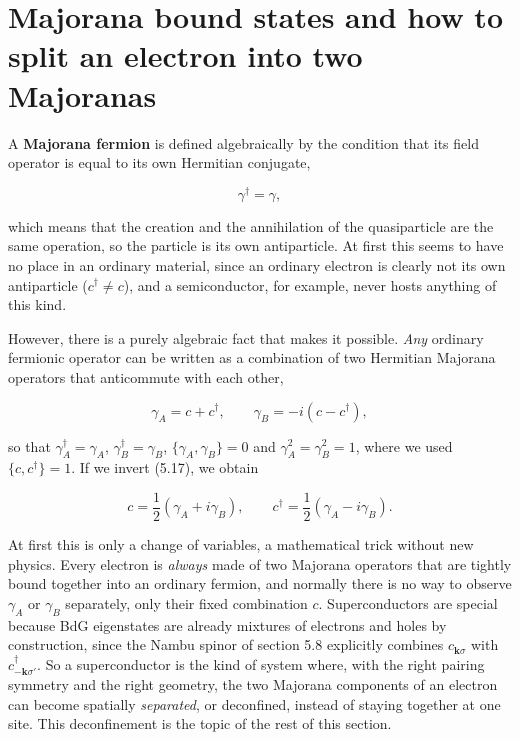 \section{Majorana bound states and how to split an electron into two Majoranas}

A \textbf{Majorana fermion} is defined algebraically by the condition that its field operator is
equal to its own Hermitian conjugate,

\begin{equation}
\gamma^\dagger = \gamma,
\end{equation}

which means that the creation and the annihilation of the quasiparticle are the same operation, so
the particle is its own antiparticle. At first this seems to have no place in an ordinary material,
since an ordinary electron is clearly not its own antiparticle ($c^\dagger \ne c$), and a
semiconductor, for example, never hosts anything of this kind.

However, there is a purely algebraic fact that makes it possible. \emph{Any} ordinary fermionic
operator can be written as a combination of two Hermitian Majorana operators that anticommute with
each other,

\begin{equation}
\gamma_A = c + c^\dagger, \qquad \gamma_B = -i\left(c - c^\dagger\right),
\end{equation}

so that $\gamma_A^\dagger = \gamma_A$, $\gamma_B^\dagger = \gamma_B$, $\{\gamma_A,\gamma_B\}=0$ and
$\gamma_A^2=\gamma_B^2=1$, where we used $\{c,c^\dagger\}=1$. If we invert (5.17), we obtain

\begin{equation}
c = \frac{1}{2}\left(\gamma_A + i\gamma_B\right), \qquad c^\dagger = \frac{1}{2}\left(\gamma_A - i\gamma_B\right).
\end{equation}

At first this is only a change of variables, a mathematical trick without new physics. Every
electron is \emph{always} made of two Majorana operators that are tightly bound together into an
ordinary fermion, and normally there is no way to observe $\gamma_A$ or $\gamma_B$ separately, only
their fixed combination $c$. Superconductors are special because BdG eigenstates are already
mixtures of electrons and holes by construction, since the Nambu spinor of section 5.8 explicitly
combines $c_{\mathbf k\sigma}$ with $c_{-\mathbf k\sigma'}^\dagger$. So a superconductor is the
kind of system where, with the right pairing symmetry and the right geometry, the two Majorana
components of an electron can become spatially \emph{separated}, or deconfined, instead of staying
together at one site. This deconfinement is the topic of the rest of this section.

